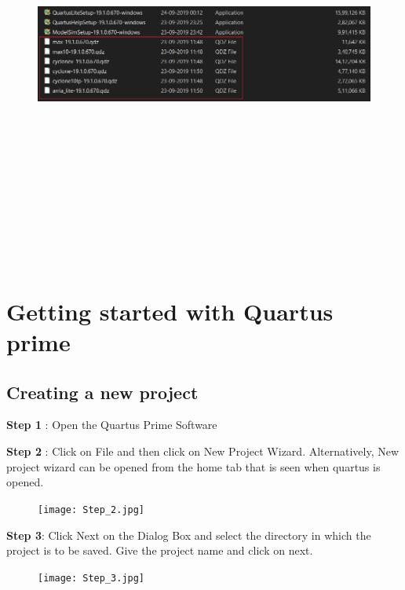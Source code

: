 \documentclass[12pt,singleside,a4paper]{article}
\begin{document}
\begin{enumerate}
\begin{figure}[H]
        \includegraphics[height = 14cm, width =14cm,keepaspectratio]{InstallationImages/Next4.png}
        \end{figure}
\end{enumerate}


\section{Getting started with Quartus prime}
\subsection{Creating a new project}
\textbf{Step 1} : Open the Quartus Prime Software

\noindent \textbf{Step 2} : Click on File and then click on New Project Wizard. Alternatively, New project wizard \hspace*{37pt} can be opened from the home tab that is seen when quartus is opened.
\begin{figure}[H]
\centering
\texttt{[image: Step\_2.jpg]}
\end{figure}
\newpage
\noindent \textbf{Step 3}: Click Next on the Dialog Box and select the directory in which the project is to be \hspace*{37pt} saved. Give the project name and click on next.
\begin{figure}[H]
\centering
\texttt{[image: Step\_3.jpg]}
\end{figure}
\end{document}

